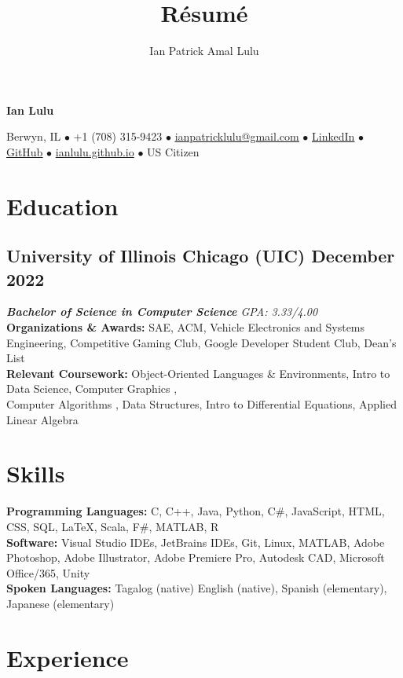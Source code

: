 \documentclass{article}
\makeatletter
\renewcommand{\maketitle}{
    \begin{center}
    {\bfseries\huge
    Ian Lulu}
    
    \vspace{0.25em}

    Berwyn, IL {$\bullet$} +1 (708) 315-9423 {$\bullet$} \href{mailto:ianpatricklulu@gmail.com}{\underline{ianpatricklulu@gmail.com}} {$\bullet$} \href{https://www.linkedin.com/in/ianlulu/}{\underline{LinkedIn}} {$\bullet$} \href{https://github.com/IanLulu}{\underline{GitHub}} {$\bullet$} \url{ianlulu.github.io}
    {$\bullet$} US Citizen
    
    \end{center}
}
\newcommand{\RomanNumeralCaps}[1]
    {\MakeUppercase{\romannumeral #1}}
\makeatother
\begin{document}
\title{R\'esum\'e}
\author{Ian Patrick Amal Lulu}


\maketitle
{} %


\section{Education}
\subsection{University of Illinois Chicago (UIC) \hfill \textnormal{December 2022}}
\vspace{-0.5em}
\textit{\textbf{Bachelor of Science in Computer Science} \hfill GPA: 3.33/4.00}
\\ %
\textbf{Organizations \& Awards:} SAE, ACM, Vehicle Electronics and Systems Engineering, Competitive Gaming Club, Google Developer Student Club, Dean's List
\\
\textbf{Relevant Coursework:} Object-Oriented Languages \& Environments, Intro to Data Science, Computer Graphics \RomanNumeralCaps{1}, \\ 
Computer Algorithms \RomanNumeralCaps{1}, Data Structures, Intro to Differential Equations, Applied Linear Algebra


\section{Skills}
\textbf{Programming Languages:} C, C++, Java, Python, C\#, JavaScript, HTML, CSS, SQL, {\LaTeX}, Scala, F\#, MATLAB, R
\\
\textbf{Software:} Visual Studio IDEs, JetBrains IDEs, Git, Linux, MATLAB, Adobe Photoshop, Adobe Illustrator, Adobe Premiere Pro, Autodesk CAD, Microsoft Office/365, Unity
\\
\textbf{Spoken Languages:} Tagalog (native) English (native), Spanish (elementary), Japanese (elementary)


\section{Experience}
\end{document}
